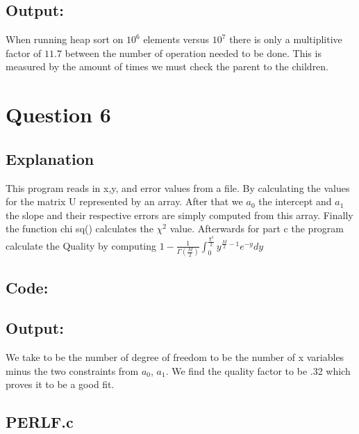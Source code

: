 \documentclass[10pt]{article}
\begin{document}
\subsection{Output:}

When running heap sort on $10^6$ elements versus $10^7$ there is only a multiplitive factor of $11.7$ between the number of operation needed to be done. This is measured by the amount of times we must check the parent to the children.\section{Question 6}
\subsection{Explanation}
This program reads in x,y, and error values from a file. By calculating the values for the matrix U represented by an array. After that we $a_0$ the intercept and $a_1$ the slope and their respective errors are simply computed from this array. Finally the function chi sq() calculates the $\chi^2$ value. Afterwards for part c the program calculate the Quality by computing $1 - \frac{1}{\Gamma(\frac{M}{2})} \int_0^{\frac{\chi^2}{2}} y^{\frac{M}{2}-1}e^{-y} dy$ \subsection{Code:}

\subsection{Output:}

We take to be the number of degree of freedom to be the number of x variables minus the two constraints from $a_0$, $a_1$. We find the quality factor to be .32 which proves it to be a good fit.\subsection{PERLF.c}

\end{document}
